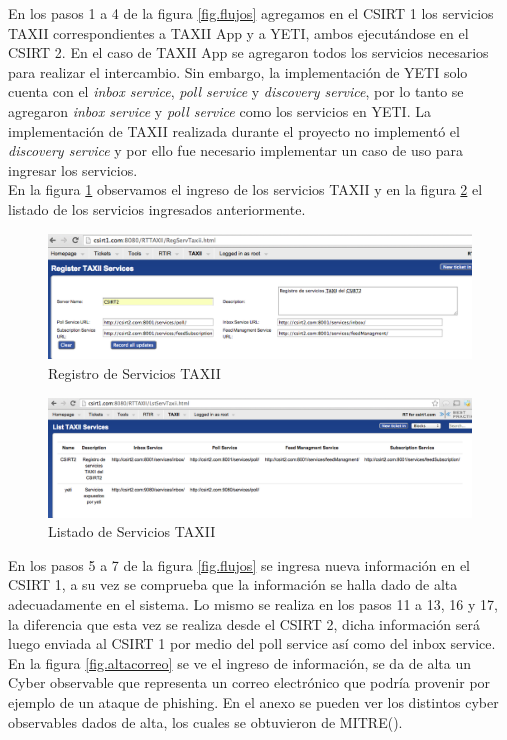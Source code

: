 En los pasos 1 a 4 de la figura \ref{fig.flujos} agregamos en el CSIRT 1 los servicios TAXII correspondientes a TAXII App y a YETI, ambos ejecutándose en el CSIRT 2.
En el caso de TAXII App se agregaron todos los servicios necesarios para realizar el intercambio. Sin embargo, la implementación de YETI solo cuenta con el \textit{inbox service}, \textit{poll service} y \textit{discovery service}, por lo tanto se agregaron \textit{inbox service} y \textit{poll service} como los servicios en YETI. La implementación de TAXII realizada durante el proyecto no implementó el \textit{discovery service} y por ello fue necesario implementar un caso de uso para ingresar los servicios. \\
\bigskip
En la figura \ref{fig.regservicios} observamos el ingreso de los servicios TAXII y en la figura \ref{fig.lstservicios} el listado de los servicios ingresados anteriormente.

\begin{figure}[H]
	\centering
	\includegraphics[scale=0.4]{caso-de-estudio/RegistroServicios.png}
	\caption{Registro de Servicios TAXII}
	\label{fig.regservicios}
\end{figure}

\begin{figure}[H]
	\centering
	\includegraphics[scale=0.35]{caso-de-estudio/listadoservicios.png}
	\caption{Listado de Servicios TAXII}
	\label{fig.lstservicios}
\end{figure}

En los pasos 5 a 7 de la figura \ref{fig.flujos} se ingresa nueva información en el CSIRT 1, a su vez se comprueba que la información se halla dado de alta adecuadamente en el sistema. Lo mismo se realiza en los pasos 11 a 13, 16 y 17, la diferencia que esta vez se realiza desde el CSIRT 2, dicha información será luego enviada al CSIRT 1 por medio del poll service así como del inbox service.
En la figura \ref{fig.altacorreo} se ve el ingreso de información, se da de alta un Cyber observable que representa un correo electrónico que podría provenir por ejemplo de un ataque de phishing. En el anexo se pueden ver los distintos cyber observables dados de alta, los cuales se obtuvieron de MITRE(\cite{mitre}).

